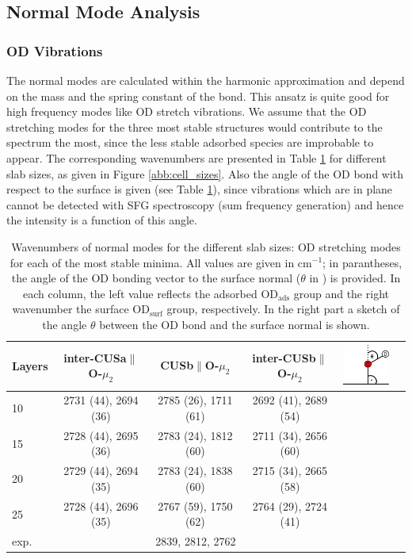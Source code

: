 \documentclass[11pt,DIV=13,BCOR=5mm,a4paper,headinclude]{scrbook}
\begin{document}
\subsection{Normal Mode Analysis}\label{nma}
\subsubsection{OD Vibrations}

The normal modes are calculated within the harmonic approximation and depend on the mass and the spring constant of the bond.
This ansatz is quite good for high frequency modes like OD stretch vibrations.
We assume that the OD stretching modes for the three most stable structures would contribute to the spectrum the most, since the less stable adsorbed species are improbable to appear.
The corresponding wavenumbers are presented in Table \ref{tab:freq_layers} for different slab sizes, as given in Figure \ref{abb:cell_sizes}.
Also the angle of the OD bond with respect to the surface is given (see Table \ref{tab:freq_layers}), since vibrations which are in plane cannot be detected with SFG spectroscopy (sum frequency generation) and hence the intensity is a function of this angle.
\begin{table}[th]
  \centering
 \caption{Wavenumbers of normal modes for the different slab sizes: OD stretching modes for each of the most stable minima.
All values are given in cm$^{-1}$; in parantheses, the angle of the OD bonding vector to the surface normal ($\theta$ in \textdegree) is provided.
In each column, the left value reflects the adsorbed OD$_\textrm{ads}$ group and the right wavenumber the surface OD$_\textrm{surf}$ group, respectively.
 In the right part a sketch of the angle $\theta$ between the OD bond and the surface normal is shown.}
\vspace*{.2cm} 
 \begin{tabular}{l|ccccc}
 \toprule
  Layers&inter-CUSa$\parallel$O-$\mu_2$ &CUSb$\parallel$O-$\mu_2$  &inter-CUSb$\parallel$O-$\mu_2$&\multirow{6}{1pt}{\includegraphics[width=2cm]{figures/11-20/ODangle.png}} \\\midrule
  10 &2731 (44), 2694 (36) &2785 (26), 1711 (61) &2692 (41), 2689 (54)& \\
  15 &2728 (44), 2695 (36) &2783 (24), 1812 (60) &2711 (34), 2656 (60)& \\
  20 &2729 (44), 2694 (35) &2783 (24), 1838 (60) &2715 (34), 2665 (58)& \\
  25 &2728 (44), 2696 (35) &2767 (59), 1750 (62) &2764 (29), 2724 (41)& \\\midrule
  exp. & \multicolumn{3}{c}{2839, 2812, 2762}& \\\bottomrule
  \end{tabular} 
  \label{tab:freq_layers}
\end{table}
\\\\
\end{document}

